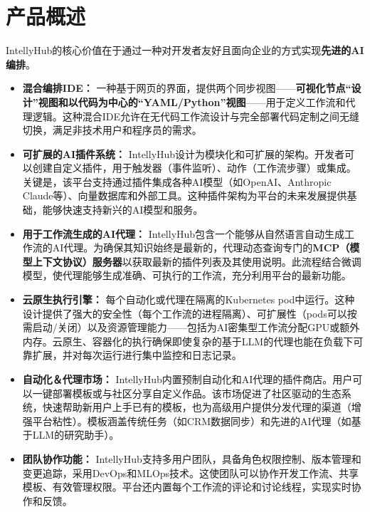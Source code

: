 \documentclass[11点, A4纸, 单面]{article}
\begin{document}
\section{产品概述}
IntellyHub的核心价值在于通过一种对开发者友好且面向企业的方式实现\textbf{先进的AI编排}。
\begin{itemize}
    \item \textbf{混合编排IDE：} 一种基于网页的界面，提供两个同步视图——\textbf{可视化节点“设计”视图和以代码为中心的“YAML/Python”视图}——用于定义工作流和代理逻辑。这种混合IDE允许在无代码工作流设计与完全部署代码定制之间无缝切换，满足非技术用户和程序员的需求。
    
    \item \textbf{可扩展的AI插件系统：} IntellyHub设计为模块化和可扩展的架构。开发者可以创建自定义插件，用于触发器（事件监听）、动作（工作流步骤）或集成。关键是，该平台支持通过插件集成各种AI模型（如OpenAI、Anthropic Claude等）、向量数据库和外部工具。这种插件架构为平台的未来发展提供基础，能够快速支持新兴的AI模型和服务。
    
    \item \textbf{用于工作流生成的AI代理：} IntellyHub包含一个能够从自然语言自动生成工作流的AI代理。为确保其知识始终是最新的，代理动态查询专门的\textbf{MCP（模型上下文协议）服务器}以获取最新的插件列表及其使用说明。此流程结合微调模型，使代理能够生成准确、可执行的工作流，充分利用平台的最新功能。
    
    \item \textbf{云原生执行引擎：} 每个自动化或代理在隔离的Kubernetes pod中运行。这种设计提供了强大的安全性（每个工作流的进程隔离）、可扩展性（pods可以按需启动/关闭）以及资源管理能力——包括为AI密集型工作流分配GPU或额外内存。云原生、容器化的执行确保即使复杂的基于LLM的代理也能在负载下可靠扩展，并对每次运行进行集中监控和日志记录。
    
    \item \textbf{自动化＆代理市场：} IntellyHub内置预制自动化和AI代理的插件商店。用户可以一键部署模板或与社区分享自定义作品。该市场促进了社区驱动的生态系统，快速帮助新用户上手已有的模板，也为高级用户提供分发代理的渠道（增强平台粘性）。模板涵盖传统任务（如CRM数据同步）和先进的AI代理（如基于LLM的研究助手）。
    
    \item \textbf{团队协作功能：} IntellyHub支持多用户团队，具备角色权限控制、版本管理和变更追踪，采用DevOps和MLOps技术。这使团队可以协作开发工作流、共享模板、有效管理权限。平台还内置每个工作流的评论和讨论线程，实现实时协作和反馈。
\end{itemize}
\end{document}
